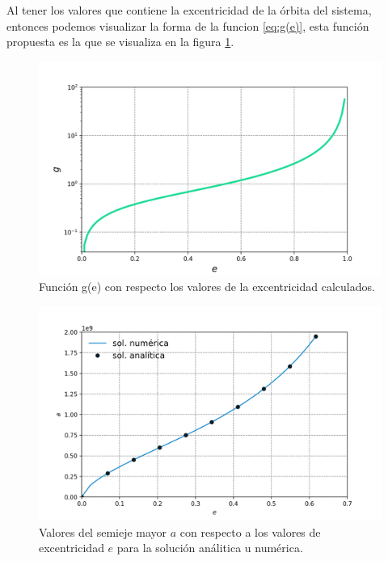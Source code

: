 Al tener los valores que contiene la excentricidad de la órbita del sistema, entonces podemos visualizar la forma de la funcion \ref{eq:g(e)}, esta 
función propuesta es la que se visualiza en la figura \ref{fig:gvse}.\\
\begin{minipage}{0.5\linewidth}
    \vspace{-0.9cm}
    \begin{figure}[H]
        \centering
        \includegraphics[scale=0.4]{images/gvse.png}
        \caption{Función g(e) con respecto los valores de la excentricidad calculados.}
        \label{fig:gvse}
    \end{figure} 
\end{minipage}
\hspace{0.5cm}
\begin{minipage}{0.45\linewidth}
\begin{figure}[H]
    \hspace{-0.7cm}
    \includegraphics[scale=0.4]{images/solana_solnum.png}
    \caption{Valores del semieje mayor $a$ con respecto a los valores de excentricidad $e$ para la solución análitica u numérica.}
    \label{fig:ananum}
\end{figure}
\end{minipage}\\
